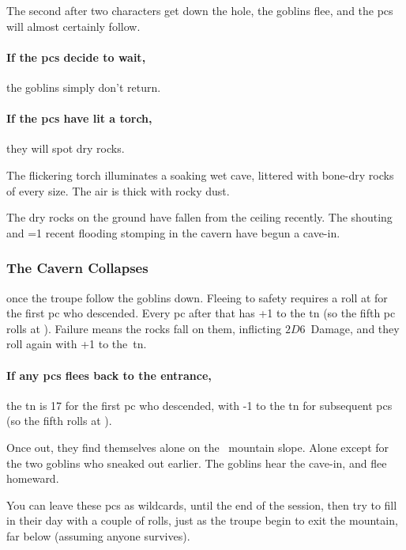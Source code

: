 \begin{multicols}{2}
The second after two characters get down the hole, the goblins flee, and the \glspl{pc} will almost certainly follow.

\paragraph{If the \glspl{pc} decide to wait,}
the goblins simply don't return.

\paragraph{If the \glspl{pc} have lit a torch,}
they will spot dry rocks.

\begin{boxtext}
  The flickering torch illuminates a soaking wet cave, littered with bone-dry rocks of every size.
  The air is thick with rocky dust.
\end{boxtext}

The dry rocks on the ground have fallen from the ceiling recently.
The shouting and \ifnum\value{temperature}=1 recent flooding \else stomping \fi in the cavern have begun a cave-in.

\subsubsection{The Cavern Collapses}
once the troupe follow the goblins down.
Fleeing to safety requires a  roll at \tn[3] for the first \gls{pc} who descended.
Every \gls{pc} after that has +1 to the \gls{tn} (so the fifth \gls{pc} rolls at \tn[7]).
Failure means the rocks fall on them, inflicting $2D6$~Damage, and they roll again with +1 to the~\gls{tn}.

\paragraph{If any \glspl{pc} flees back to the entrance,}
the \gls{tn} is 17 for the first \gls{pc} who descended, with -1 to the \gls{tn} for subsequent \glspl{pc} (so the fifth rolls at \tn[13]).

Once out, they find themselves alone on the \showTemperature\ mountain slope.
Alone except for the two goblins who sneaked out earlier.
The goblins hear the cave-in, and flee homeward.

\label{pcRunaways}
You can leave these \glspl{pc} as wildcards, until the end of the session, then try to fill in their day with a couple of rolls, just as the troupe begin to exit the mountain, far below (assuming anyone survives).


\end{multicols}
